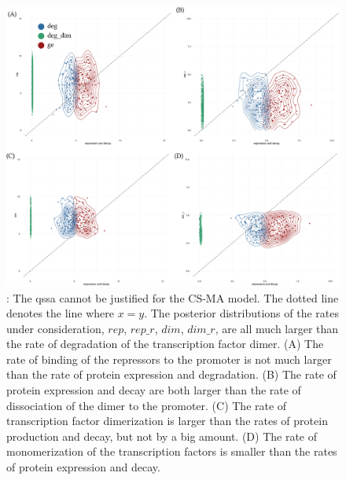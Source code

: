 



\begin{figure}[htbp]
\begin{center}
\includegraphics[width=\textwidth]{../../chapters/chapterStabilityFinder/images/qssa-cs-sym.png}
\caption[Testing the QSSA assumptions on the mass action models]{ \label{fig:ma_qssa}: The \acrshort{qssa} cannot be justified for the CS-MA model. The dotted line denotes the line where $x = y$. The posterior distributions of the rates under consideration, $rep$, $rep\_r$, $dim$, $dim\_r$, are all much larger than the rate of degradation of the transcription factor dimer. (A) The rate of binding of the repressors to the promoter is not much larger than the rate of protein expression and degradation. (B) The rate of protein expression and decay are both larger than the rate of dissociation of the dimer to the promoter. (C) The rate of transcription factor dimerization is larger than the rates of protein production and decay, but not by a big amount. (D) The rate of monomerization of the transcription factors is smaller than the rates of protein expression and decay.}
\end{center}
\end{figure}
\clearpage



